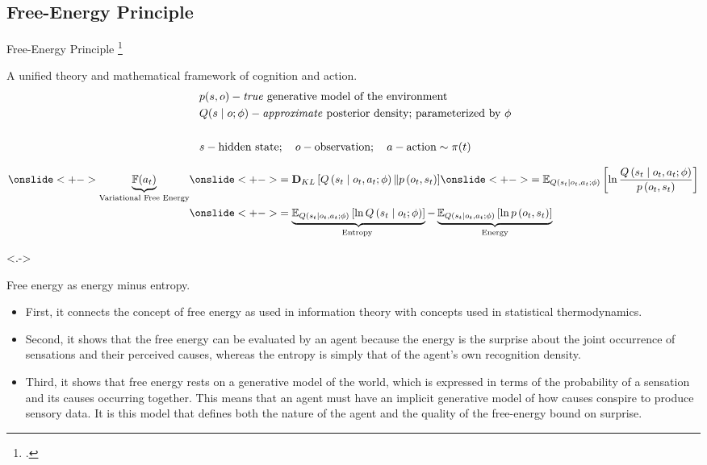 \documentclass[t,aspectratio=169,xcolor=dvipsnames]{beamer}
\newcommand\blfootcitetext[1]{%
  \begingroup
  \renewcommand\thefootnote{}\footcitetext{#1}%
  \addtocounter{footnote}{-1}%
  \endgroup
}
\newcommand{\citec}[1]{\hfill\textcolor{lightgray}{\citep{#1}}}
\newcommand{\cname}[2]{\texorpdfstring{#1 \citec{#2}}{#1}}
\begin{document}
\subsection{\cname{Free-Energy Principle}{friston2010free}}
{
\setbeamercovered{}
\begin{frame}{Free-Energy Principle}
    \blfootcitetext{friston2010free}
    A unified theory and mathematical framework of cognition and action.
    \begin{align*}
        & {p(s, o) - \text{\textit{true} generative model of the environment}}\\
        & Q(s \mid o ; \phi) - \text{\textit{approximate} posterior density; parameterized by}\ \phi\\~\\
        & s - \text{hidden state};\quad
        o - \text{observation};\quad
        a - \text{action} \sim\pi(t)
    \end{align*}

    \begin{align*}
        \onslide<+->{\underbrace{\mathbb{F}(a_t)}_{\text{Variational Free Energy}}} &
        \onslide<+->{=\mathbf{D}_{K L}\left[Q\left(s_t \mid o_t, a_t ; \phi\right) \| p\left(o_t, s_t\right)\right]}
        \onslide<+->{=\mathbb{E}_{Q\left(s_t \mid o_t, a_t ; \phi\right)}\left[\ln \frac{Q\left(s_t \mid o_t, a_t ; \phi\right)}{p\left(o_t, s_t\right)}\right]}\\ &
        \onslide<+->{=\underbrace{\mathbb{E}_{Q\left(s_t \mid o_t, a_t ; \phi\right)}\left[\ln Q\left(s_t \mid o_t ; \phi\right)\right]}_{\text {Entropy }}-\underbrace{\mathbb{E}_{Q\left(s_t \mid o_t, a_t ; \phi\right)}\left[\ln p\left(o_t, s_t\right)\right]}_{\text {Energy}}}
    \end{align*}

    \note<.->{
        Free energy as energy minus entropy.
        \begin{itemize}
            \item First, it connects the concept of free energy as used in information theory with concepts used in statistical thermodynamics.
            \item Second, it shows that the free energy can be evaluated by an agent because the energy is the surprise about the joint occurrence of sensations and their perceived causes, whereas the entropy is simply that of the agent’s own recognition density.
            \item Third, it shows that free energy rests on a generative model of the world, which is expressed in terms of the probability of a sensation and its causes occurring together. This means that an agent must have an implicit generative model of how causes conspire to produce sensory data. It is this model that defines both the nature of the agent and the quality of the free-energy bound on surprise.
        \end{itemize}
    }
    

\end{frame}}
\end{document}
